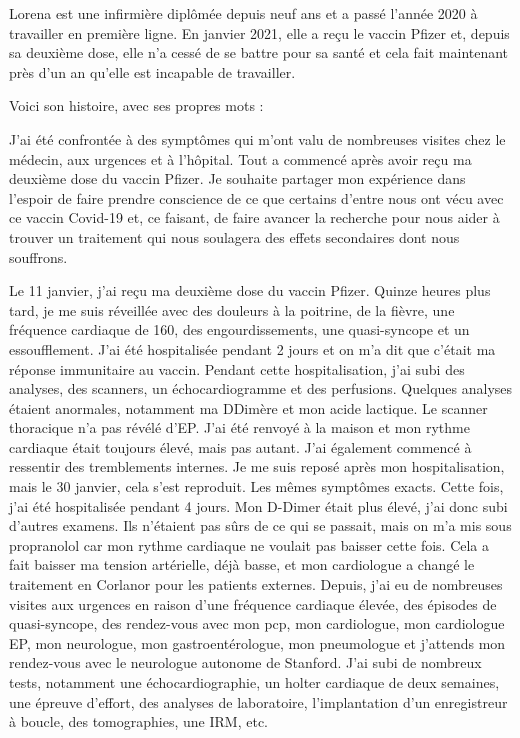 Lorena est une infirmière diplômée depuis neuf ans et a passé l'année 2020 à
travailler en première ligne. En janvier 2021, elle a reçu le vaccin Pfizer et,
depuis sa deuxième dose, elle n'a cessé de se battre pour sa santé et cela fait
maintenant près d'un an qu'elle est incapable de travailler.

Voici son histoire, avec ses propres mots :

J'ai été confrontée à des symptômes qui m'ont valu de nombreuses visites chez le
médecin, aux urgences et à l'hôpital. Tout a commencé après avoir reçu ma
deuxième dose du vaccin Pfizer. Je souhaite partager mon expérience dans
l'espoir de faire prendre conscience de ce que certains d'entre nous ont vécu
avec ce vaccin Covid-19 et, ce faisant, de faire avancer la recherche pour nous
aider à trouver un traitement qui nous soulagera des effets secondaires dont
nous souffrons.

Le 11 janvier, j'ai reçu ma deuxième dose du vaccin Pfizer. Quinze heures plus
tard, je me suis réveillée avec des douleurs à la poitrine, de la fièvre, une
fréquence cardiaque de 160, des engourdissements, une quasi-syncope et un
essoufflement. J'ai été hospitalisée pendant 2 jours et on m'a dit que c'était
ma réponse immunitaire au vaccin. Pendant cette hospitalisation, j'ai subi des
analyses, des scanners, un échocardiogramme et des perfusions. Quelques analyses
étaient anormales, notamment ma DDimère et mon acide lactique. Le scanner
thoracique n'a pas révélé d'EP. J'ai été renvoyé à la maison et mon rythme
cardiaque était toujours élevé, mais pas autant. J'ai également commencé à
ressentir des tremblements internes. Je me suis reposé après mon
hospitalisation, mais le 30 janvier, cela s'est reproduit. Les mêmes symptômes
exacts. Cette fois, j'ai été hospitalisée pendant 4 jours. Mon D-Dimer était
plus élevé, j'ai donc subi d'autres examens. Ils n'étaient pas sûrs de ce qui se
passait, mais on m'a mis sous propranolol car mon rythme cardiaque ne voulait
pas baisser cette fois. Cela a fait baisser ma tension artérielle, déjà basse,
et mon cardiologue a changé le traitement en Corlanor pour les patients
externes. Depuis, j'ai eu de nombreuses visites aux urgences en raison d'une
fréquence cardiaque élevée, des épisodes de quasi-syncope, des rendez-vous avec
mon pcp, mon cardiologue, mon cardiologue EP, mon neurologue, mon
gastroentérologue, mon pneumologue et j'attends mon rendez-vous avec le
neurologue autonome de Stanford. J'ai subi de nombreux tests, notamment une
échocardiographie, un holter cardiaque de deux semaines, une épreuve d'effort,
des analyses de laboratoire, l'implantation d'un enregistreur à boucle, des
tomographies, une IRM, etc.

